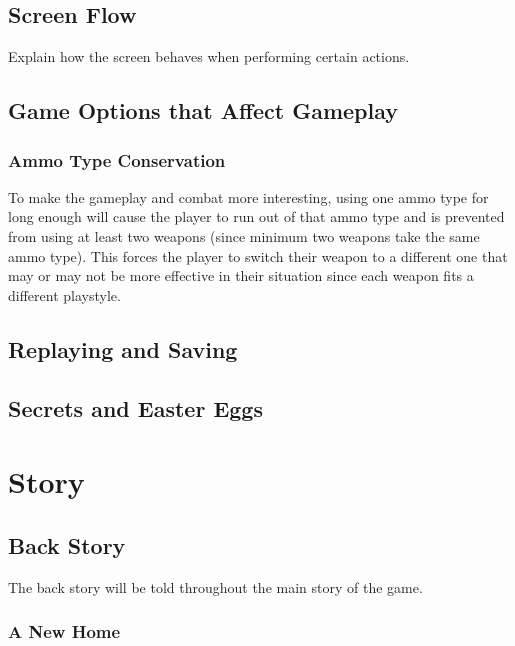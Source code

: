 \documentclass[12pt]{article}
\begin{document}
\subsection{Screen Flow}

Explain how the screen behaves when performing certain actions.

\subsection{Game Options that Affect Gameplay}

\subsubsection{Ammo Type Conservation}

To make the gameplay and combat more interesting, using one ammo type for long enough will cause the player to run out of that ammo type and is prevented from using at least two weapons (since minimum two weapons take the same ammo type). This forces the player to switch their weapon to a different one that may or may not be more effective in their situation since each weapon fits a different playstyle. 

\subsection{Replaying and Saving}

\subsection{Secrets and Easter Eggs}

\section{Story}

\subsection{Back Story}

The back story will be told throughout the main story of the game. 

\subsubsection{A New Home}
\end{document}
